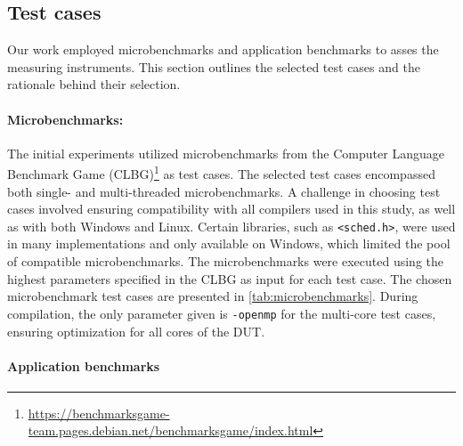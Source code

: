 \subsection{Test cases}\label{subsec:test_cases}

Our work employed microbenchmarks and application benchmarks to asses the measuring instruments. This section outlines the selected test cases and the rationale behind their selection.

\paragraph{Microbenchmarks:} 
The initial experiments utilized microbenchmarks from the Computer Language Benchmark Game (CLBG)\footnote{\url{https://benchmarksgame-team.pages.debian.net/benchmarksgame/index.html}} as test cases. The selected test cases encompassed both single- and multi-threaded microbenchmarks. A challenge in choosing test cases involved ensuring compatibility with all compilers used in this study, as well as with both Windows and Linux. Certain libraries, such as \texttt{<sched.h>}, were used in many implementations and only available on Windows, which limited the pool of compatible microbenchmarks. The microbenchmarks were executed using the highest parameters specified in the CLBG as input for each test case. The chosen microbenchmark test cases are presented in \cref{tab:microbenchmarks}. During compilation, the only parameter given is \texttt{-openmp} for the multi-core test cases, ensuring optimization for all cores of the DUT.



\paragraph{Application benchmarks}
